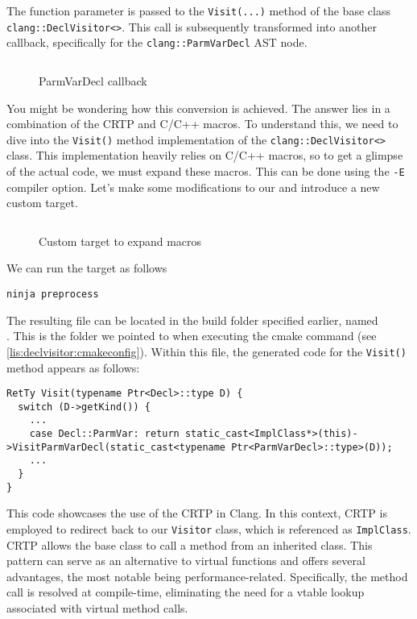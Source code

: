 The function parameter is passed to the \texttt{Visit(...)} method of
the base class \texttt{clang::DeclVisitor<>}. This call is subsequently
transformed into another callback, specifically for the
\texttt{clang::ParmVarDecl} AST node. 
\begin{figure}[H]
  \inputminted[firstline=13,lastline=15]{c++}{src/part1/ch3_ast/declvisitor/Visitor.hpp}
  \caption{ParmVarDecl callback}
  \label{lis:declvisitor:visitor:visitparmvardecl}
\end{figure}
You might be wondering how this conversion is achieved. The answer lies in a
combination of the CRTP and C/C++ macros. To understand this, we need to dive
into the \texttt{Visit()} method implementation of the
\texttt{clang::DeclVisitor<>} class. This implementation heavily relies
on C/C++ macros, so to get a glimpse of the actual code, we must expand these
macros. This can be done using the \texttt{-E} compiler option. Let's
make some modifications to our  and introduce a new
custom target.  
\begin{figure}[H]
\inputminted[highlightlines={19},
  firstline=25,lastline=31]{cmake}{src/part1/ch3_ast/declvisitor/CMakeLists.txt}
\caption{Custom target to expand macros}
\label{lis:declvisitor:cmakelists:customtarget}
\end{figure}
We can run the target as follows
\begin{adjustwidth}{0em}{0em}
\begin{verbatim}
ninja preprocess
\end{verbatim}
\end{adjustwidth}
The resulting file can be located in the build folder specified earlier, named
\\ .
This is the folder we pointed to when
executing the cmake command (see \cref{lis:declvisitor:cmakeconfig}). Within
this file, the generated code for the \texttt{Visit()} method appears
as follows:  
\begin{verbatim}
RetTy Visit(typename Ptr<Decl>::type D) {
  switch (D->getKind()) {
    ...
    case Decl::ParmVar: return static_cast<ImplClass*>(this)->VisitParmVarDecl(static_cast<typename Ptr<ParmVarDecl>::type>(D)); 
    ...
  }
}
\end{verbatim}
This code showcases the use of the CRTP
in Clang. In this context, CRTP is employed to redirect back to our
\texttt{Visitor} class, which is referenced as
\texttt{ImplClass}. CRTP allows the base class to call a method from an
inherited class. This pattern can serve as an alternative to virtual functions
and offers several advantages, the most notable being
performance-related. Specifically, the method call is resolved at compile-time,
eliminating the need for a vtable lookup associated with virtual method calls. 

